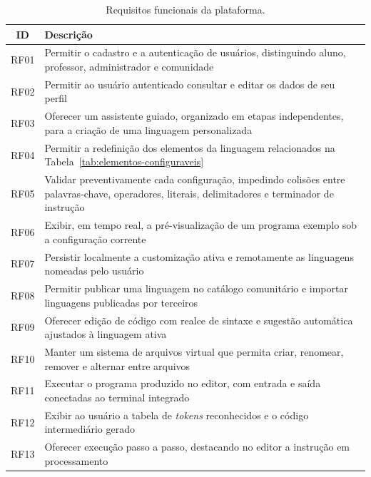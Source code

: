 \begin{table}[htbp]
    \centering
    \caption{Requisitos funcionais da plataforma.}
    \label{tab:requisitos-funcionais}
    \footnotesize
    \setlength{\tabcolsep}{4pt}
    \renewcommand{\arraystretch}{1.15}
    \begin{tabular}{|c|>{\raggedright\arraybackslash}p{12.3cm}|}
        \hline
        \textbf{ID} & \textbf{Descrição} \\
        \hline
        RF01 & Permitir o cadastro e a autenticação de usuários, distinguindo aluno, professor, administrador e comunidade \\
        \hline
        RF02 & Permitir ao usuário autenticado consultar e editar os dados de seu perfil \\
        \hline
        RF03 & Oferecer um assistente guiado, organizado em etapas independentes, para a criação de uma linguagem personalizada \\
        \hline
        RF04 & Permitir a redefinição dos elementos da linguagem relacionados na Tabela~\ref{tab:elementos-configuraveis} \\
        \hline
        RF05 & Validar preventivamente cada configuração, impedindo colisões entre palavras-chave, operadores, literais, delimitadores e terminador de instrução \\
        \hline
        RF06 & Exibir, em tempo real, a pré-visualização de um programa exemplo sob a configuração corrente \\
        \hline
        RF07 & Persistir localmente a customização ativa e remotamente as linguagens nomeadas pelo usuário \\
        \hline
        RF08 & Permitir publicar uma linguagem no catálogo comunitário e importar linguagens publicadas por terceiros \\
        \hline
        RF09 & Oferecer edição de código com realce de sintaxe e sugestão automática ajustados à linguagem ativa \\
        \hline
        RF10 & Manter um sistema de arquivos virtual que permita criar, renomear, remover e alternar entre arquivos \\
        \hline
        RF11 & Executar o programa produzido no editor, com entrada e saída conectadas ao terminal integrado \\
        \hline
        RF12 & Exibir ao usuário a tabela de \textit{tokens} reconhecidos e o código intermediário gerado \\
        \hline
        RF13 & Oferecer execução passo a passo, destacando no editor a instrução em processamento \\

\end{tabular}
\end{table}
